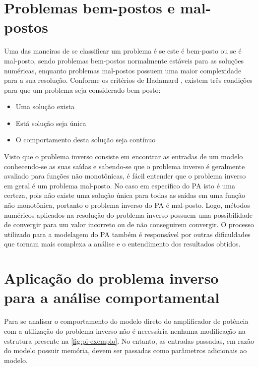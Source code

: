 \section{Problemas bem-postos e mal-postos} \label{sec:pi-posto}
Uma das maneiras de se classificar um problema é se este é bem-posto ou se é mal-posto, sendo problemas bem-postos normalmente estáveis para as soluções numéricas, enquanto problemas mal-postos possuem uma maior complexidade para a sua resolução. Conforme os critérios de Hadamard \cite{hadamard1902problemes}, existem três condições para que um problema seja considerado bem-posto:
\begin{itemize}
  \item Uma solução exista
  \item Está solução seja única
  \item O comportamento desta solução seja contínuo
\end{itemize}

Visto que o problema inverso consiste em encontrar as entradas de um modelo conhecendo-se as suas saídas e sabendo-se que o problema inverso é geralmente avaliado para funções não monotônicas, é fácil entender que o problema inverso em geral é um problema mal-posto.
No caso em específico do PA isto é uma certeza, pois não existe uma solução única para todas as saídas em uma função não monotônica, portanto o problema inverso do PA é mal-posto. Logo, métodos numéricos aplicados na resolução do problema inverso possuem uma possibilidade de convergir para um valor incorreto ou de não conseguirem convergir. O processo utilizado para a modelagem do PA também é responsável por outras dificuldades que tornam mais complexa a análise e o entendimento dos resultados obtidos.

\section{Aplicação do problema inverso para a análise comportamental} \label{sec:pi-app}
Para se analisar o comportamento do modelo direto do amplificador de potência com a utilização do problema inverso não é necessária nenhuma modificação na estrutura presente na \autoref{fig:pi-exemplo}. No entanto, as entradas passadas, em razão do modelo possuir memória, devem ser passadas como parâmetros adicionais ao modelo.